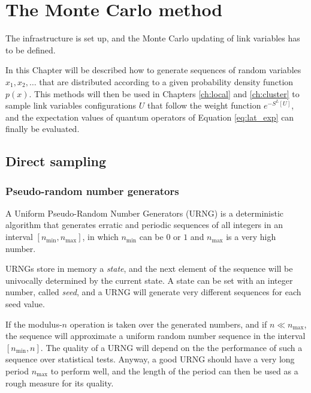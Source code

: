 \chapter{The Monte Carlo method}\label{ch:mc}

The infrastructure is set up, and the Monte Carlo updating of link variables has to be defined.

In this Chapter will be described how to generate sequences of random variables $x_1, x_2, \ldots$ that are distributed according to a given probability density function $p(x)$.
This methods will then be used in Chapters \ref{ch:local} and \ref{ch:cluster} to sample link variables configurations ${U}$ that follow the weight function $e^{-S^L[U]}$,
and the expectation values of quantum operators of Equation \eqref{eq:lat_exp} can finally be evaluated.

%
%

\section{Direct sampling}
\subsection*{Pseudo-random number generators}
A Uniform Pseudo-Random Number Generators (URNG) is a deterministic algorithm that generates erratic and periodic
sequences of all integers in an interval $[n_\mathrm{min},n_\mathrm{max}]$, in which $n_\mathrm{min}$ can be $0$ or $1$ and $n_\mathrm{max}$ is a very high number.

URNGs store in memory a \emph{state}, and the next element of the sequence will be univocally determined by the current state.
A state can be set with an integer number, called \emph{seed}, and a URNG will generate very different sequences for each seed value. 

If the modulus-$n$ operation is taken over the generated numbers, and if $n\ll n_\mathrm{max}$,
the sequence will approximate a uniform random number sequence in the interval $[n_\mathrm{min},n]$.
The quality of a URNG will depend on the the performance of such a sequence over statistical tests.
Anyway, a good URNG should have a very long period $n_\mathrm{max}$ to perform well,
and the length of the period can then be used as a rough measure for its quality.

